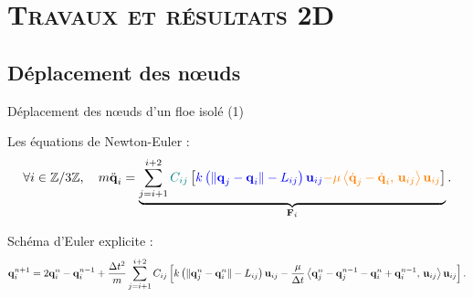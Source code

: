 


\section{\textsc{Travaux et résultats 2D}}


\subsection{Déplacement des n\oe{}uds}


\begin{frame}{Déplacement des n\oe{}uds d'un floe isolé (1)}


	\vspace{-0.5cm}
    Les équations de Newton-Euler :
    \begin{align*}
        \forall i \in \mathbb{Z}/3\mathbb{Z}, \quad m \ddot{\bm{\mathrm{q}}}_i = \underbrace{\sum_{j=i+1}^{i+2} \textcolor{teal}{C_{ij}} \left[  \textcolor{blue}{k \left( \Vert \bm{\mathrm{q}}_j - \bm{\mathrm{q}}_i \Vert - L_{ij} \right) \bm{\mathrm{u}}_{ij}} \textcolor{orange}{- \mu \left\langle \dot{\bm{\mathrm{q}}}_j - \dot{\bm{\mathrm{q}}}_i, \, \bm{\mathrm{u}}_{ij}  \right\rangle  \bm{\mathrm{u}}_{ij}}  \right]}_{\bm{\mathrm{F}}_i} . 
    \end{align*}

    Schéma d’Euler explicite :
    \begin{align*} \label{eq:systeme2D}
        \bm{\mathrm{q}}_{i}^{n+1} = 2\bm{\mathrm{q}}_{i}^{n}-\bm{\mathrm{q}}_{i}^{n-1} + \frac{\Delta t^2}{m} \sum_{j=i+1}^{i+2}C_{ij}\left[ k \left( \Vert \bm{\mathrm{q}}_j^n - \bm{\mathrm{q}}_i^n \Vert - L_{ij} \right) \bm{\mathrm{u}}_{ij} - \frac{\mu}{\Delta t} \left\langle \bm{\mathrm{q}}_{j}^{n}-\bm{\mathrm{q}}_{j}^{n-1} - \bm{\mathrm{q}}_{i}^{n}+\bm{\mathrm{q}}_{i}^{n-1}, \, \bm{\mathrm{u}}_{ij} \right\rangle  \bm{\mathrm{u}}_{ij}  \right].
    \end{align*}
    
\end{frame}


